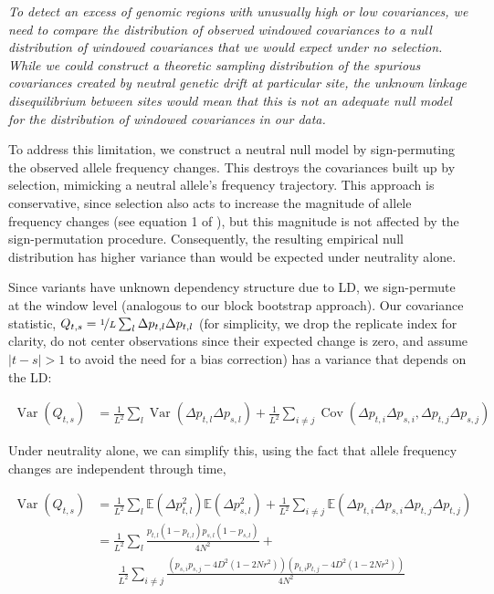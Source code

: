 \documentclass[11pt]{article}
\newcommand{\vb}[1]{{\it \color{blue} #1}}
\newcommand{\E}{\mathbb{E}}
\DeclareMathOperator{\var}{Var}
\DeclareMathOperator{\cov}{Cov}
\begin{document}
\vb{To detect an excess of genomic regions with unusually high or low covariances,
we need to compare the distribution of observed windowed covariances to a null
distribution of windowed covariances that we would expect under no selection.
While we could construct a theoretic sampling distribution of the spurious
covariances created by neutral genetic drift at particular site, the unknown
linkage disequilibrium between sites would mean that this is not an adequate
null model for the distribution of windowed covariances in our data. 

To address this limitation, we construct a neutral null model by sign-permuting
the observed allele frequency changes. This destroys the covariances built up
by selection, mimicking a neutral allele's frequency trajectory. This approach
is conservative, since selection also acts to increase the magnitude of allele
frequency changes (see equation 1 of \cite{Buffalo2019-io}), but this magnitude
is not affected by the sign-permutation procedure. Consequently, the resulting
empirical null distribution has higher variance than would be expected under
neutrality alone.

Since variants have unknown dependency structure due to LD, we sign-permute at
the window level (analogous to our block bootstrap approach). Our covariance
statistic, $Q_{t,s} = \nicefrac{1}{L} \sum_l \Delta p_{t,l} \Delta p_{t,l}$
(for simplicity, we drop the replicate index for clarity, do not center
observations since their expected change is zero, and assume $|t-s| > 1$ to
avoid the need for a bias correction) has a variance that depends on the LD:

\begin{align}
  \var(Q_{t,s}) &= \frac{1}{L^2} \sum_l \var(\Delta p_{t,l} \Delta p_{s,l}) + \frac{1}{L^2} \sum_{i \ne j} \cov(\Delta p_{t,i}\Delta p_{s,i}, \Delta p_{t,j}\Delta p_{s,j}) 
\end{align}

Under neutrality alone, we can simplify this, using the fact that allele
frequency changes are independent through time,

\begin{align}
  \var(Q_{t,s}) &= \frac{1}{L^2} \sum_l \E(\Delta p_{t,l}^2) \E(\Delta p_{s,l}^2) + \frac{1}{L^2} \sum_{i \ne j} \E(\Delta p_{t,i} \Delta p_{s,i} \Delta p_{t,j} \Delta p_{t,j}) \\
  &= \frac{1}{L^2} \sum_l \frac{p_{t,l}(1-p_{t,l}) p_{s,l}(1-p_{s,l})}{4N^2} + \\ \nonumber 
  & \;\;\;\;\;\; \frac{1}{L^2} \sum_{i \ne j} \frac{\left(p_{s,i} p_{s,j}-4 D^2 \left(1-2 N r^2\right) \right) \left( p_{t,i} p_{t,j}-4 D^2 \left(1-2 N r^2\right) \right)}{4 N^2}
\end{align}
%

}
\end{document}
